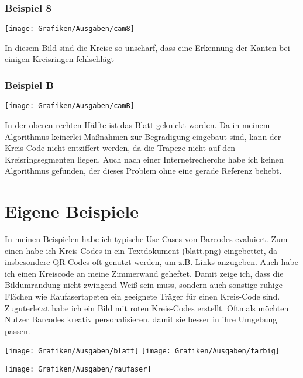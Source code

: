 \subsubsection{Beispiel 8}
\begin{minipage}{0.7\textwidth}
\texttt{[image: Grafiken/Ausgaben/cam8]}
\end{minipage}
\begin{minipage}{0.3\textwidth}
In diesem Bild sind die Kreise so unscharf, dass eine Erkennung der Kanten bei einigen Kreisringen fehlschlägt
\end{minipage}

\subsubsection{Beispiel B}
\begin{minipage}{0.7\textwidth}
\texttt{[image: Grafiken/Ausgaben/camB]}
\end{minipage}
\begin{minipage}{0.3\textwidth}
In der oberen rechten Hälfte ist das Blatt geknickt worden. Da in meinem Algorithmus keinerlei Maßnahmen zur Begradigung eingebaut sind, kann der Kreis-Code nicht entziffert werden, da die Trapeze nicht auf den Kreisringsegmenten liegen. Auch nach einer Internetrecherche habe ich keinen Algorithmus gefunden, der dieses Problem ohne eine gerade Referenz behebt.
\end{minipage}

\pagebreak
\section{Eigene Beispiele}
In meinen Beispielen habe ich typische Use-Cases von Barcodes evaluiert. Zum einen habe ich Kreis-Codes in ein Textdokument (blatt.png) eingebettet, da insbesondere QR-Codes oft genutzt werden, um z.B. Links anzugeben.
Auch habe ich einen Kreiscode an meine Zimmerwand geheftet. Damit zeige ich, dass die Bildumrandung nicht zwingend Weiß sein muss, sondern auch sonstige ruhige Flächen wie Raufasertapeten ein geeignete Träger für einen Kreis-Code sind.
Zuguterletzt habe ich ein Bild mit roten Kreis-Codes erstellt. Oftmals möchten Nutzer Barcodes kreativ personalisieren, damit sie besser in ihre Umgebung passen.

\begin{center}
\texttt{[image: Grafiken/Ausgaben/blatt]}
\hspace{1em}
\texttt{[image: Grafiken/Ausgaben/farbig]}
\end{center}
\begin{center}
\texttt{[image: Grafiken/Ausgaben/raufaser]}
\end{center}

